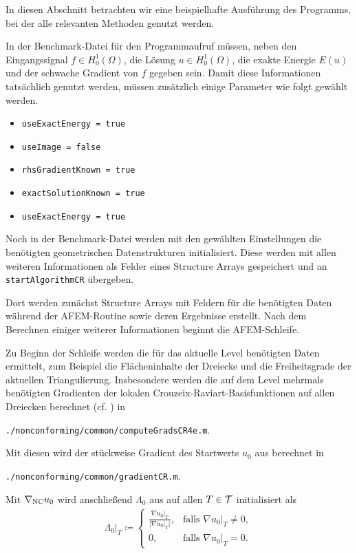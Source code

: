 In diesen Abschnitt betrachten wir eine beispielhafte Ausführung des Programms,
bei der alle relevanten Methoden genutzt werden.

In der Benchmark-Datei für den Programmaufruf müssen, neben den Eingangssignal
$f\in H^1_0(\Omega)$, die Lösung $u\in H^1_0(\Omega)$, die exakte Energie
$E(u)$ und der schwache Gradient von $f$ gegeben sein. 
Damit diese Informationen tatsächlich genutzt werden, müssen zusätzlich einige
Parameter wie folgt gewählt werden.
\begin{itemize}
  \item \texttt{useExactEnergy = true}
  \item \texttt{useImage = false}
  \item \texttt{rhsGradientKnown = true}
  \item \texttt{exactSolutionKnown = true}
  \item \texttt{useExactEnergy = true}
\end{itemize}

Noch in der Benchmark-Datei werden mit den gewählten Einstellungen die
benötigten geometrischen Datenstrukturen initialisiert. 
Diese werden mit allen weiteren Informationen als Felder eines Structure Arrays
gespeichert und an \texttt{startAlgorithmCR} übergeben. 

Dort werden zunächst Structure Arrays mit Feldern für die benötigten Daten
während der AFEM-Routine sowie deren Ergebnisse erstellt. 
Nach dem Berechnen einiger weiterer Informationen beginnt die AFEM-Schleife.

Zu Beginn der Schleife werden die für das aktuelle Level benötigten Daten
ermittelt, zum Beispiel die Flächeninhalte der Dreiecke und die Freiheitsgrade
der aktuellen Triangulierung. 
Insbesondere werden die auf dem Level mehrmals benötigten Gradienten der
lokalen Crouzeix-Raviart-Basisfunktionen auf allen Dreiecken berechnet (cf.
\cite[Abschnitt 1.4.2]{CGKNRR10}) in
\begin{center}
  \texttt{./nonconforming/common/computeGradsCR4e.m}.
\end{center}
Mit diesen wird der stückweise Gradient des Startwerts $u_0$ aus
 berechnet in
\begin{center}
  \texttt{./nonconforming/common/gradientCR.m}.
\end{center}
Mit $\nabla_\textup{NC} u_0$ wird anschließend $\Lambda_0$ aus
 auf allen $T\in\mathcal{T}$ initialisiert als 
\begin{align*}
  \Lambda_0|_T\coloneqq
  \begin{cases}
    \frac{\nabla u_0|_T}{|\nabla u_0|_T|},&\text{falls }\nabla u_0|_T\neq 0,\\
    0,&\text{falls }\nabla u_0|_T= 0.
  \end{cases}
\end{align*}

